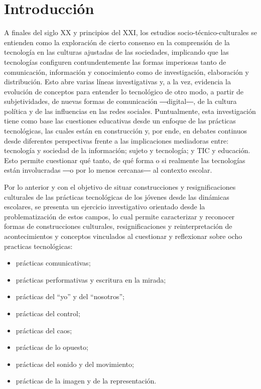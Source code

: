 \documentclass[spanish]{textolivre}
\begin{document}
\begin{polyabstract}
\begin{english}
\begin{abstract}
\end{abstract}
\end{english}

\end{polyabstract}


\section{Introducción}\label{sec-intro}
A finales del siglo XX y principios del XXI, los estudios socio-técnico-culturales \cite{levy_cibercultura._2007} se entienden como la exploración de cierto consenso en la comprensión de la tecnología en las culturas ajustadas de las sociedades, implicando que las tecnologías configuren contundentemente las formas imperiosas tanto de comunicación, información y conocimiento como de investigación, elaboración y distribución. Esto abre varias líneas investigativas y, a la vez, evidencia la evolución de conceptos para entender lo tecnológico de otro modo, a partir de subjetividades, de nuevas formas de comunicación ―digital―, de la cultura política y de las influencias en las redes sociales. Puntualmente, esta investigación tiene como base las cuestiones educativas desde un enfoque de las prácticas tecnológicas, las cuales están en construcción y, por ende, en debates continuos desde diferentes perspectivas frente a las implicaciones mediadoras entre: tecnología y sociedad de la información; sujeto y tecnología; y TIC y educación. Esto permite cuestionar qué tanto, de qué forma o si realmente las tecnologías están involucradas ―o por lo menos cercanas― al contexto escolar.

Por lo anterior y con el objetivo de situar construcciones y resignificaciones culturales de las prácticas tecnológicas de los jóvenes desde las dinámicas escolares, se presenta un ejercicio investigativo orientado desde la problematización de estos campos, lo cual permite caracterizar y reconocer formas de construcciones culturales, resignificaciones y reinterpretación de acontecimientos y conceptos vinculados al cuestionar y reflexionar sobre ocho practicas tecnológicas:

\begin{itemize}
    \item prácticas comunicativas;
    \item prácticas performativas y escritura en la mirada;
    \item prácticas del “yo” y del “nosotros”;
    \item prácticas del control;
    \item prácticas del caos;
    \item prácticas de lo opuesto;
    \item prácticas del sonido y del movimiento;
    \item prácticas de la imagen y de la representación.
\end{itemize}
\end{document}
